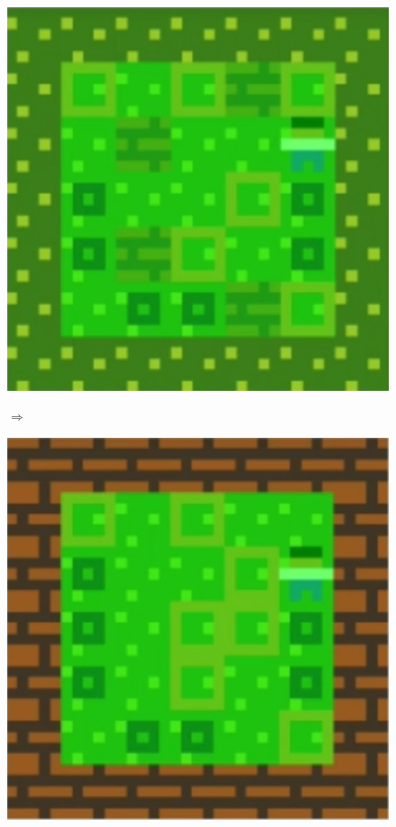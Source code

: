 \begin{figure}[!htbp]
\begin{minipage}[t]{0.25\textwidth}
\includegraphics[width=\textwidth]{figures/part5i2_cropped.png} \hfill \\
\end{minipage}
$\Longrightarrow$
\begin{minipage}[t]{0.25\textwidth}
\includegraphics[width=\textwidth]{figures/part5i3_cropped.png} \hfill \\

\end{minipage}
\end{figure}
